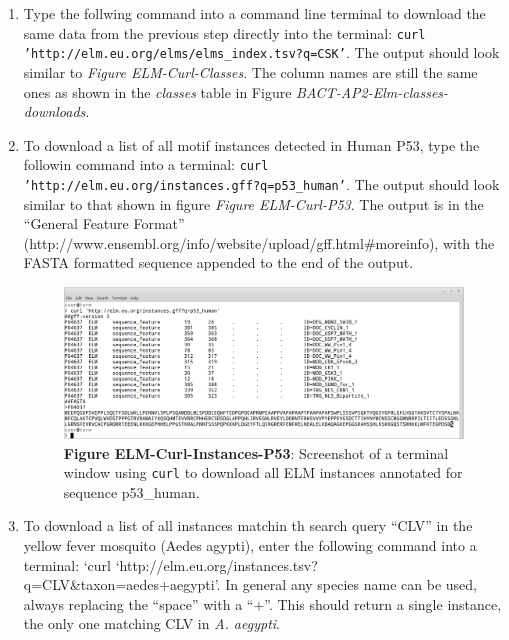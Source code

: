 \begin{enumerate}
\item Type the follwing command into a command line terminal to
	download the same data from the previous step directly into the
	terminal: \texttt{curl
	'http://elm.eu.org/elms/elms\_index.tsv?q=CSK'}.  The output
	should look similar to \emph{Figure ELM-Curl-Classes}. The
	column names are still the same ones as shown in the
	\emph{classes} table in Figure
	\emph{BACT-AP2-Elm-classes-downloads}.


\item To download a list of all motif instances detected in Human P53, type the
	followin command into a terminal: \texttt{curl
	'http://elm.eu.org/instances.gff?q=p53\_human'}. The output should look
	similar to that shown in figure \emph{Figure ELM-Curl-P53}.  The output
	is in the ``General Feature Format''
	(http://www.ensembl.org/info/website/upload/gff.html\#moreinfo), with
	the FASTA formatted sequence appended to the end of the output.  


\begin{figure}[h!]
	\centering
	\includegraphics[width=\textwidth]{Figures/search_REST/elm_curl_instances_p53_human.png}
	\caption{
	\textbf{Figure ELM-Curl-Instances-P53}: Screenshot of a terminal window
	using \texttt{curl} to download all ELM instances annotated for sequence
	p53\_human.
	}
	\label{fig:search_REST_instances}
\end{figure}

\item To download a list of all instances matchin th search query ``CLV'' in
	the yellow fever mosquito (Aedes agypti), enter the following command
	into a terminal: `curl
	`http://elm.eu.org/instances.tsv?q=CLV\&taxon=aedes+aegypti'. In
	general any species name can be used, always replacing the ``space''
	with a ``+''. This should return a single instance, the only one
	matching CLV in \emph{A. aegypti}.


\end{enumerate}
